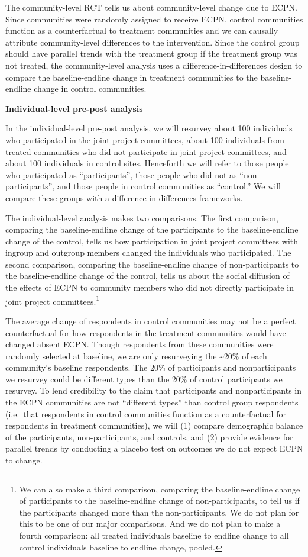 \documentclass[
]{article}
\begin{document}
The community-level RCT tells us about community-level change due to
ECPN. Since communities were randomly assigned to receive ECPN, control
communities function as a counterfactual to treatment communities and we
can causally attribute community-level differences to the intervention.
Since the control group should have parallel trends with the treatment
group if the treatment group was not treated, the community-level
analysis uses a difference-in-differences design to compare the
baseline-endline change in treatment communities to the baseline-endline
change in control communities.

\textbf{Individual-level pre-post analysis}

In the individual-level pre-post analysis, we will resurvey about 100
individuals who participated in the joint project committees, about 100
individuals from treated communities who did not participate in joint
project committees, and about 100 individuals in control sites.
Henceforth we will refer to those people who participated as
``participants'', those people who did not as ``non-participants'', and
those people in control communities as ``control.'' We will compare
these groups with a difference-in-differences frameworks.

The individual-level analysis makes two comparisons. The first
comparison, comparing the baseline-endline change of the participants to
the baseline-endline change of the control, tells us how participation
in joint project committees with ingroup and outgroup members changed
the individuals who participated. The second comparison, comparing the
baseline-endline change of non-participants to the baseline-endline
change of the control, tells us about the social diffusion of the
effects of ECPN to community members who did not directly participate in
joint project committees.\footnote{We can also make a third comparison,
  comparing the baseline-endline change of participants to the
  baseline-endline change of non-participants, to tell us if the
  participants changed more than the non-participants. We do not plan
  for this to be one of our major comparisons. And we do not plan to
  make a fourth comparison: all treated individuals baseline to endline
  change to all control individuals baseline to endline change, pooled.}

The average change of respondents in control communities may not be a
perfect counterfactual for how respondents in the treatment communities
would have changed absent ECPN. Though respondents from these
communities were randomly selected at baseline, we are only resurveying
the \textasciitilde20\% of each community's baseline respondents. The
20\% of participants and nonparticipants we resurvey could be different
types than the 20\% of control participants we resurvey. To lend
credibility to the claim that participants and nonparticipants in the
ECPN communities are not ``different types'' than control group
respondents (i.e.~that respondents in control communities function as a
counterfactual for respondents in treatment communities), we will (1)
compare demographic balance of the participants, non-participants, and
controls, and (2) provide evidence for parallel trends by conducting a
placebo test on outcomes we do not expect ECPN to change.
\end{document}
